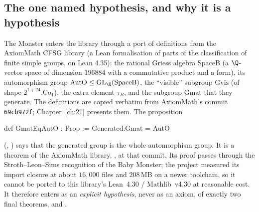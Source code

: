 \subsection{The one named hypothesis, and why it is a hypothesis}\label{ch16:sec:gmat}

The Monster enters the library through a port of definitions from the AxiomMath CFSG library (a Lean formalisation
of parts of the classification of finite simple groups, on Lean 4.35): the rational Griess algebra
$\mathrm{SpaceB}$ (a $\Q$-vector space of dimension $196884$ with a commutative product and a form), its
automorphism group $\mathrm{AutO}\le\mathrm{GL}_\Q(\mathrm{SpaceB})$, the ``visible'' subgroup $\mathrm{Gvis}$ (of
shape $2^{1+24}.\mathrm{Co}_1$), the extra element $\tau_B$, and the subgroup $\mathrm{Gmat}$ that they generate.  The
definitions are copied verbatim from AxiomMath's commit \texttt{69cb972f}; Chapter~\ref{ch:21} presents them.  The
proposition
\begin{leancode}
def GmatEqAutO : Prop :=
  Generated.Gmat = AutO
\end{leancode}
(, ) says that the
generated group is the whole automorphism group.  It is a theorem of the AxiomMath library,
, at that commit.  Its proof passes through the
Stroth--Leon--Sims recognition of the Baby Monster; the project measured its import closure at about $16{,}000$ files
and $208$\,MB on a newer toolchain, so it cannot be ported to this
library's Lean~4.30 / Mathlib~v4.30 at reasonable cost.  It therefore enters as an \emph{explicit hypothesis}, never
as an axiom, of exactly two final theorems,  and .

